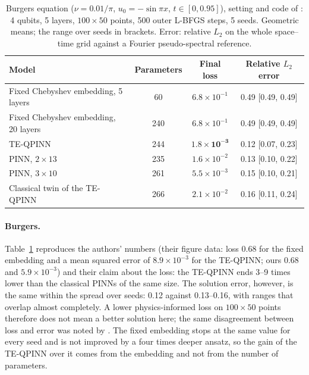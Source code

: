 \documentclass[11pt]{article}
\theoremstyle{remark}\newtheorem*{remark}{Remark}
\begin{document}
\begin{table}[t]
  \centering
  \caption{Burgers equation ($\nu=0.01/\pi$, $u_0=-\sin\pi x$, $t\in[0,0.95]$), setting and code of
           \citet{berger2025teqpinn}: 4 qubits, 5 layers, $100\times50$ points, 500 outer L-BFGS steps, 5 seeds.
           Geometric means; the range over seeds in brackets. Error: relative $L_2$ on the whole space--time grid
           against a Fourier pseudo-spectral reference.}
  \label{tab:burgers}
  \begin{tabular}{lccc}
    \toprule
    Model & Parameters & Final loss & Relative $L_2$ error \\
    \midrule
    Fixed Chebyshev embedding, 5 layers   & 60  & $6.8\times10^{-1}$ & 0.49 [0.49, 0.49] \\
    Fixed Chebyshev embedding, 20 layers  & 240 & $6.8\times10^{-1}$ & 0.49 [0.49, 0.49] \\
    TE-QPINN \citep{berger2025teqpinn}    & 244 & $\bm{1.8\times10^{-3}}$ & 0.12 [0.07, 0.23] \\
    PINN, $2\times13$                     & 235 & $1.6\times10^{-2}$ & 0.13 [0.10, 0.22] \\
    PINN, $3\times10$                     & 261 & $5.5\times10^{-3}$ & 0.15 [0.10, 0.21] \\
    Classical twin of the TE-QPINN        & 266 & $2.1\times10^{-2}$ & 0.16 [0.11, 0.24] \\
    \bottomrule
  \end{tabular}
\end{table}

\paragraph{Burgers.} Table~\ref{tab:burgers} reproduces the authors' numbers (their figure data: loss $0.68$ for the fixed
embedding and a mean squared error of $8.9\times10^{-3}$ for the TE-QPINN; ours $0.68$ and $5.9\times10^{-3}$) and their
claim about the loss: the TE-QPINN ends 3--9 times lower than the classical PINNs of the same size. The solution error,
however, is the same within the spread over seeds: 0.12 against 0.13--0.16, with ranges that overlap almost completely.
A lower physics-informed loss on $100\times50$ points therefore does not mean a better solution here; the
same disagreement between loss and error was noted by \citet{tran2026embedding}.
The fixed embedding stops at the same value for every seed and is not improved by a four times deeper ansatz, so the
gain of the TE-QPINN over it comes from the embedding and not from the number of parameters.
\end{document}
